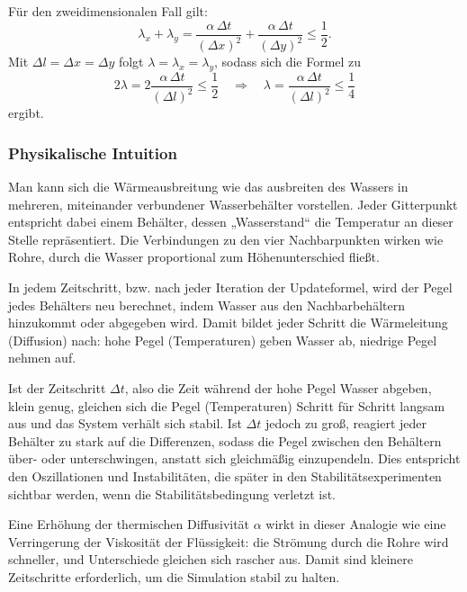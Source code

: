 Für den zweidimensionalen Fall gilt:
\begin{equation}
	\lambda_x + \lambda_y =
	\frac{\alpha \, \Delta t}{(\Delta x)^2} +
	\frac{\alpha \, \Delta t}{(\Delta y)^2} \leq \frac{1}{2}.
\end{equation}
Mit \(\Delta l = \Delta x = \Delta y\) folgt \(\lambda = \lambda_x = \lambda_y\), sodass sich die Formel zu
\begin{equation}
	\label{parallelisierung:eq:stabForExp}
	2\lambda = 2 \frac{\alpha \, \Delta t}{(\Delta l)^2} \leq \frac{1}{2}
	\quad \Rightarrow \quad
	\lambda = \frac{\alpha \, \Delta t}{(\Delta l)^2} \leq \frac{1}{4}
\end{equation}
ergibt.

\subsubsection{Physikalische Intuition}  
Man kann sich die Wärmeausbreitung wie das ausbreiten des Wassers in mehreren, miteinander verbundener Wasserbehälter vorstellen.
Jeder Gitterpunkt entspricht dabei einem Behälter, dessen „Wasserstand“ die Temperatur an dieser Stelle repräsentiert.
Die Verbindungen zu den vier Nachbarpunkten wirken wie Rohre, durch die Wasser proportional zum Höhenunterschied fließt.

In jedem Zeitschritt, bzw. nach jeder Iteration der Updateformel, wird der Pegel jedes Behälters neu berechnet, indem Wasser aus den Nachbarbehältern hinzukommt oder abgegeben wird.
Damit bildet jeder Schritt die Wärmeleitung (Diffusion) nach: hohe Pegel (Temperaturen) geben Wasser ab, niedrige Pegel nehmen auf.

Ist der Zeitschritt  \(\Delta t\), also die Zeit während der hohe Pegel Wasser abgeben, klein genug, gleichen sich die Pegel (Temperaturen) Schritt für Schritt langsam aus und das System verhält sich stabil.
Ist \(\Delta t\) jedoch zu groß, reagiert jeder Behälter zu stark auf die Differenzen, sodass die Pegel zwischen den Behältern über- oder unterschwingen, anstatt sich gleichmäßig einzupendeln.
Dies entspricht den Oszillationen und Instabilitäten, die später in den Stabilitätsexperimenten sichtbar werden, wenn die Stabilitätsbedingung verletzt ist.

Eine Erhöhung der thermischen Diffusivität \(\alpha\) wirkt in dieser Analogie wie eine Verringerung der Viskosität der Flüssigkeit: die Strömung durch die Rohre wird schneller, und Unterschiede gleichen sich rascher aus.
Damit sind kleinere Zeitschritte erforderlich, um die Simulation stabil zu halten.

